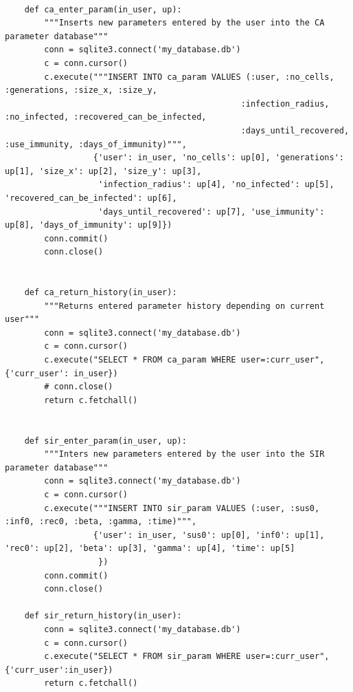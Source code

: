 \documentclass[11pt, a4paper]{article}
\begin{document}
\begin{lstlisting}
    
    def ca_enter_param(in_user, up):
        """Inserts new parameters entered by the user into the CA parameter database"""
        conn = sqlite3.connect('my_database.db')
        c = conn.cursor()
        c.execute("""INSERT INTO ca_param VALUES (:user, :no_cells, :generations, :size_x, :size_y,
                                                :infection_radius, :no_infected, :recovered_can_be_infected,
                                                :days_until_recovered, :use_immunity, :days_of_immunity)""",
                  {'user': in_user, 'no_cells': up[0], 'generations': up[1], 'size_x': up[2], 'size_y': up[3],
                   'infection_radius': up[4], 'no_infected': up[5], 'recovered_can_be_infected': up[6],
                   'days_until_recovered': up[7], 'use_immunity': up[8], 'days_of_immunity': up[9]})
        conn.commit()
        conn.close()
    
    
    def ca_return_history(in_user):
        """Returns entered parameter history depending on current user"""
        conn = sqlite3.connect('my_database.db')
        c = conn.cursor()
        c.execute("SELECT * FROM ca_param WHERE user=:curr_user", {'curr_user': in_user})
        # conn.close()
        return c.fetchall()
    
    
    def sir_enter_param(in_user, up):
        """Inters new parameters entered by the user into the SIR parameter database"""
        conn = sqlite3.connect('my_database.db')
        c = conn.cursor()
        c.execute("""INSERT INTO sir_param VALUES (:user, :sus0, :inf0, :rec0, :beta, :gamma, :time)""",
                  {'user': in_user, 'sus0': up[0], 'inf0': up[1], 'rec0': up[2], 'beta': up[3], 'gamma': up[4], 'time': up[5]
                   })
        conn.commit()
        conn.close()
    
    def sir_return_history(in_user):
        conn = sqlite3.connect('my_database.db')
        c = conn.cursor()
        c.execute("SELECT * FROM sir_param WHERE user=:curr_user", {'curr_user':in_user})
        return c.fetchall()
\end{lstlisting}


\newpage

% 
\end{document}
